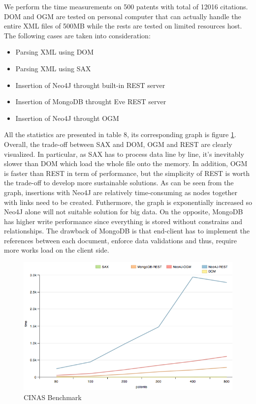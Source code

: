 \documentclass{article}
\begin{document}
 We perform the time measurements on 500 patents with total of 12016 citations. DOM and OGM are tested on personal computer that can actually handle the entire XML files of 500MB while the rests are tested on limited resources host. The following cases are taken into consideration:
 \begin{itemize}
 \item  Parsing XML using DOM
 \item Parsing XML using SAX
 \item Insertion of Neo4J throught built-in REST server
 \item Insertion of MongoDB throught Eve REST server
 \item Insertion of Neo4J throught OGM
\end{itemize}
 
All the statistics are presented in table 8, its corresponding graph is figure \ref{fig:benchmark}. Overall, the trade-off between SAX and DOM, OGM and REST are clearly visualized. In particular, as SAX has to process data line by line, it's inevitably slower than DOM which load the whole file onto the memory. In addition, OGM is faster than REST in term of performance, but the simplicity of REST is worth the trade-off to develop more sustainable solutions. As can be seen from the graph, insertions with Neo4J are relatively time-consuming as nodes together with links need to be created. Futhermore, the graph is exponentially increased so Neo4J alone will not suitable solution for big data. On the opposite, MongoDB has higher write performance since everything is stored without constrains and relationships. The drawback of MongoDB is that end-client has to implement the references between each document, enforce data validations and thus, require more works load on the client side. 
 
 \begin{figure}[H]
\centering
\includegraphics[width=\textwidth]{line.png}
\caption{CINAS Benchmark} \label{fig:benchmark}
\end{figure}
\end{document}
